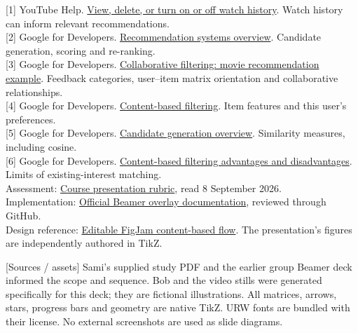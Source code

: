 \documentclass[11pt,a4paper]{article}
\newcommand{\parttitle}[2]{\vspace{9pt}{\color{forest}\large\bfseries #1}\hfill{\small #2}\par}
\begin{document}
\parttitle{Sources keyed to the slide footers}{}
{\small
[1] YouTube Help. \href{https://support.google.com/youtube/answer/95725?hl=en}{View, delete, or turn on or off watch history}. Watch history can inform relevant recommendations.\\[4pt]
[2] Google for Developers. \href{https://developers.google.com/machine-learning/recommendation/overview/types}{Recommendation systems overview}. Candidate generation, scoring and re-ranking.\\[4pt]
[3] Google for Developers. \href{https://developers.google.com/machine-learning/recommendation/collaborative/basics}{Collaborative filtering: movie recommendation example}. Feedback categories, user--item matrix orientation and collaborative relationships.\\[4pt]
[4] Google for Developers. \href{https://developers.google.com/machine-learning/recommendation/content-based/basics}{Content-based filtering}. Item features and this user's preferences.\\[4pt]
[5] Google for Developers. \href{https://developers.google.com/machine-learning/recommendation/overview/candidate-generation}{Candidate generation overview}. Similarity measures, including cosine.\\[4pt]
[6] Google for Developers. \href{https://developers.google.com/machine-learning/recommendation/content-based/summary}{Content-based filtering advantages and disadvantages}. Limits of existing-interest matching.\\[4pt]
Assessment: \href{https://docs.google.com/spreadsheets/d/13hVJ5WrcioEIvfQzsFdadwhF6t6n7sJk/edit?gid=137144296}{Course presentation rubric}, read 8 September 2026.\\[4pt]
Implementation: \href{https://github.com/josephwright/beamer/blob/main/doc/beamerug-overlays.tex}{Official Beamer overlay documentation}, reviewed through GitHub.\\[4pt]
Design reference: \href{https://www.figma.com/board/jf0wu99bi2lEHuuL2iPeoO}{Editable FigJam content-based flow}. The presentation's figures are independently authored in TikZ.
}

{\footnotesize [Sources / assets] Sami's supplied study PDF and the earlier group Beamer deck informed the scope and sequence. Bob and the video stills were generated specifically for this deck; they are fictional illustrations. All matrices, arrows, stars, progress bars and geometry are native TikZ. URW fonts are bundled with their license. No external screenshots are used as slide diagrams.}
\end{document}
